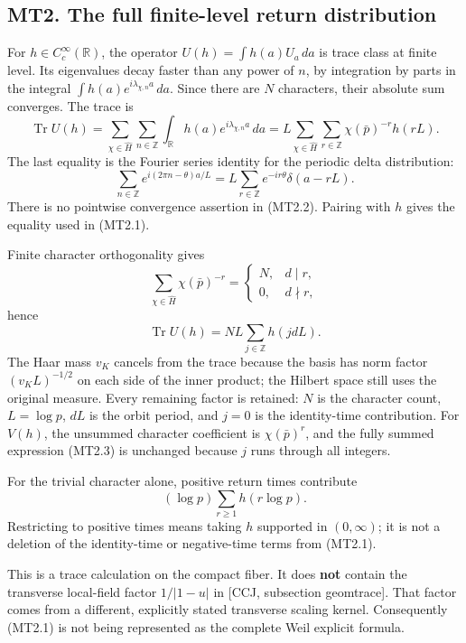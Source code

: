 \subsection{MT2. The full finite-level return
distribution}\label{mt2.-the-full-finite-level-return-distribution}

For \(h\in C_c^\infty(\mathbb R)\), the operator
\(U(h)=\int h(a)U_a\,da\) is trace class at finite level. Its
eigenvalues decay faster than any power of \(n\), by integration by
parts in the integral \(\int h(a)e^{i\lambda_{\chi,n}a}\,da\). Since
there are \(N\) characters, their absolute sum converges. The trace is
\[
 \operatorname{Tr}U(h)
 =\sum_{\chi\in\widehat H}\sum_{n\in\mathbb Z}
    \int_{\mathbb R}h(a)e^{i\lambda_{\chi,n}a}\,da
 =L\sum_{\chi\in\widehat H}\sum_{r\in\mathbb Z}
      \chi(\bar p)^{-r}h(rL).
\tag{MT2.1}
\] The last equality is the Fourier series identity for the periodic
delta distribution: \[
 \sum_{n\in\mathbb Z}e^{i(2\pi n-\theta)a/L}
   =L\sum_{r\in\mathbb Z}e^{-ir\theta}\delta(a-rL).
\tag{MT2.2}
\] There is no pointwise convergence assertion in (MT2.2). Pairing with
\(h\) gives the equality used in (MT2.1).

Finite character orthogonality gives \[
 \sum_{\chi\in\widehat H}\chi(\bar p)^{-r}
   =\begin{cases}N,&d\mid r,\\0,&d\nmid r,\end{cases}
\] hence \[
 \operatorname{Tr}U(h)=NL\sum_{j\in\mathbb Z}h(jdL).
\tag{MT2.3}
\] The Haar mass \(v_K\) cancels from the trace because the basis has
norm factor \((v_KL)^{-1/2}\) on each side of the inner product; the
Hilbert space still uses the original measure. Every remaining factor is
retained: \(N\) is the character count, \(L=\log p\), \(dL\) is the
orbit period, and \(j=0\) is the identity-time contribution. For
\(V(h)\), the unsummed character coefficient is \(\chi(\bar p)^r\), and
the fully summed expression (MT2.3) is unchanged because \(j\) runs
through all integers.

For the trivial character alone, positive return times contribute \[
 (\log p)\sum_{r\ge1}h(r\log p).
\tag{MT2.4}
\] Restricting to positive times means taking \(h\) supported in
\((0,\infty)\); it is not a deletion of the identity-time or
negative-time terms from (MT2.1).

This is a trace calculation on the compact fiber. It does \textbf{not}
contain the transverse local-field factor \(1/|1-u|\) in {[}CCJ,
subsection geomtrace{]}. That factor comes from a different, explicitly
stated transverse scaling kernel. Consequently (MT2.1) is not being
represented as the complete Weil explicit formula.

